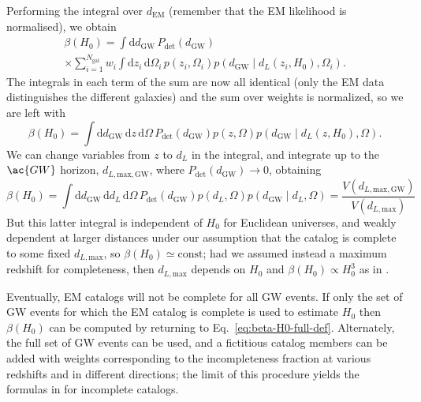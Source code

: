 \documentclass[modern]{article}
\newcommand{\dd}{\mathrm{d}}
\newcommand{\dEM}{d_{\mathrm{EM}}}
\newcommand{\dGW}{d_{\mathrm{GW}}}
\newcommand{\Ngal}{N_{\mathrm{gal}}}
\newcommand{\Pdet}{P_{\mathrm{det}}}
\begin{document}
Performing the integral over $\dEM$ (remember that the \ac{EM} likelihood is
normalised), we obtain
%
\begin{multline}
    \beta\left( H_0 \right) =  \int \dd \dGW \, \Pdet\left( \dGW \right) \\ \times \sum_{i=1}^{\Ngal} w_i \int \dd z_i \, \dd \Omega_i \, p\left( z_i, \Omega_i \right) p\left( \dGW \mid d_L\left( z_i, H_0 \right), \Omega_i \right).
\end{multline}
%
The integrals in each term of the sum are now all identical (only the \ac{EM}
data distinguishes the different galaxies) and the sum over weights is
normalized, so we are left with
%
\begin{equation}
     \beta\left( H_0 \right) =  \int \dd \dGW \, \dd z \, \dd \Omega \, \Pdet\left( \dGW \right)  p\left( z, \Omega \right) p\left( \dGW \mid d_L\left( z, H_0 \right), \Omega \right).
\end{equation}
%
We can change variables from $z$ to $d_L$ in the integral, and integrate up to
the $\ac{GW}$ horizon, $d_{L,\mathrm{max},\mathrm{GW}}$, where $\Pdet\left( \dGW
\right) \to 0$, obtaining
%
\begin{equation}
    \beta\left( H_0 \right) =  \int \dd \dGW \, \dd d_L \, \dd \Omega \, \Pdet\left( \dGW \right)  p\left( d_L, \Omega \right) p\left( \dGW \mid d_L, \Omega \right) = \frac{V \left( d_{L,\mathrm{max},\mathrm{GW}} \right)}{V\left( d_{L,\mathrm{max}} \right)}
\end{equation}
%
But this latter integral is independent of $H_0$ for Euclidean universes, and
weakly dependent at larger distances under our assumption that the catalog is
complete to some fixed $d_{L, \mathrm{max}}$, so $\beta\left( H_0 \right) \simeq
\mathrm{const}$; had we assumed instead a maximum redshift for completeness,
then $d_{L, \mathrm{max}}$ depends on $H_0$ and $\beta\left( H_0 \right) \propto
H_0^3$ as in \cite{Fishbach2018}.

Eventually, \ac{EM} catalogs will not be complete for all \ac{GW} events.  If
only the set of \ac{GW} events for which the \ac{EM} catalog is complete is used
to estimate $H_0$ then $\beta\left( H_0 \right)$ can be computed by returning to
Eq.\ \eqref{eq:beta-H0-full-def}.  Alternately, the full set of \ac{GW} events
can be used, and a fictitious catalog members can be added with weights
corresponding to the incompleteness fraction at various redshifts and in
different directions; the limit of this procedure yields the formulas in
\cite{Fishbach2018} for incomplete catalogs.
\end{document}
